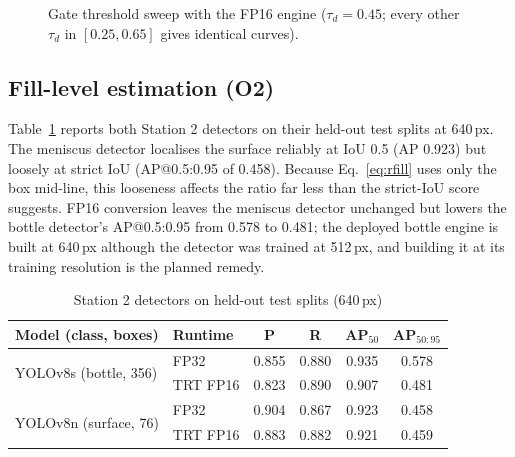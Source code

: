 \begin{figure}[htbp]
\centering
{}
\caption[Gate threshold sweep]{Gate threshold sweep with the FP16 engine ($\tau_d=0.45$; every other $\tau_d$ in $[0.25,0.65]$ gives identical curves).}
\label{fig:sweep}
\end{figure}

\subsection{Fill-level estimation (O2)}
\label{sec:res-fill}
Table~\ref{tab:filldet} reports both Station 2 detectors on their held-out test splits at 640\,px. The meniscus detector localises the surface reliably at IoU 0.5 (AP 0.923) but loosely at strict IoU (AP@0.5:0.95 of 0.458). Because Eq.~\eqref{eq:rfill} uses only the box mid-line, this looseness affects the ratio far less than the strict-IoU score suggests. FP16 conversion leaves the meniscus detector unchanged but lowers the bottle detector's AP@0.5:0.95 from 0.578 to 0.481; the deployed bottle engine is built at 640\,px although the detector was trained at 512\,px, and building it at its training resolution is the planned remedy.

\begin{table}[htbp]
\centering
\caption{Station 2 detectors on held-out test splits (640\,px)}
\label{tab:filldet}
\footnotesize
\begin{tabular}{|l|l|c|c|c|c|}
\hline
\textbf{Model (class, boxes)} & \textbf{Runtime} & \textbf{P} & \textbf{R} & \textbf{AP$_{50}$} & \textbf{AP$_{50:95}$} \\ \hline
\multirow{2}{*}{YOLOv8s (bottle, 356)} & FP32 & 0.855 & 0.880 & 0.935 & 0.578 \\ \cline{2-6}
 & TRT FP16 & 0.823 & 0.890 & 0.907 & 0.481 \\ \hline
\multirow{2}{*}{YOLOv8n (surface, 76)} & FP32 & 0.904 & 0.867 & 0.923 & 0.458 \\ \cline{2-6}
 & TRT FP16 & 0.883 & 0.882 & 0.921 & 0.459 \\ \hline
\end{tabular}
\end{table}


